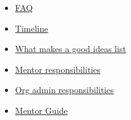 \documentclass{article}
\begin{document}
\begin{itemize}\item \href{https://developers.google.com/open-source/gsoc/faq}{FAQ}
\item \href{https://developers.google.com/open-source/gsoc/timeline}{Timeline}
\item \href{https://google.github.io/gsocguides/mentor/defining-a-project-ideas-list.html}{What makes a good ideas list}
\item \href{https://developers.google.com/open-source/gsoc/help/responsibilities#mentor_responsibilities}{Mentor responsibilities}
\item \href{https://developers.google.com/open-source/gsoc/help/responsibilities#org_admin_responsibilities}{Org admin responsibilities}
\item \href{https://google.github.io/gsocguides/mentor/}{Mentor Guide}
\end{itemize}
\end{document}
